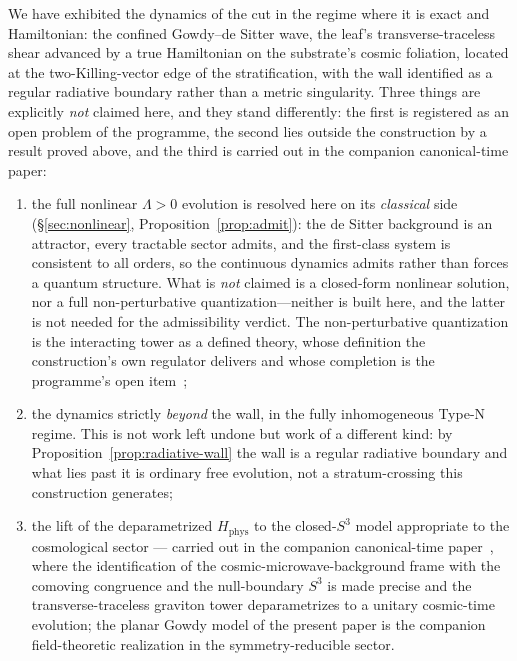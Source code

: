 \documentclass[11pt,a4paper]{article}
\theoremstyle{plain}
\theoremstyle{definition}
\theoremstyle{remark}
\newcommand{\Hphys}{H_{\mathrm{phys}}}
\begin{document}
We have exhibited the dynamics of the cut in the regime where it is exact and Hamiltonian: the confined Gowdy--de Sitter wave, the leaf's transverse-traceless shear advanced by a true Hamiltonian on the substrate's cosmic foliation, located at the two-Killing-vector edge of the stratification, with the wall identified as a regular radiative boundary rather than a metric singularity. Three things are explicitly \emph{not} claimed here, and they stand differently: the first is registered as an open problem of the programme, the second lies outside
the construction by a result proved above, and the third is carried out in the companion canonical-time paper:
\begin{enumerate}
\item the full nonlinear $\Lambda>0$ evolution is resolved here on its \emph{classical} side (\S\ref{sec:nonlinear}, Proposition~\ref{prop:admit}): the de Sitter background is an attractor, every tractable sector admits, and the first-class system is consistent to all orders, so the continuous dynamics admits rather than forces a quantum structure. What is \emph{not} claimed is a closed-form nonlinear solution, nor a full non-perturbative quantization---neither is built here, and the latter is not needed for the admissibility verdict. The non-perturbative quantization is the interacting tower as a defined theory, whose definition the construction's own regulator delivers and whose completion is the programme's open item~\cite{JanzenCanonicalTime};
\item the dynamics strictly \emph{beyond} the wall, in the fully inhomogeneous Type-N regime. This is not work left undone but work of a different kind: by Proposition~\ref{prop:radiative-wall} the wall is a regular radiative boundary and what lies past it is ordinary free evolution, not a stratum-crossing this construction generates;
\item the lift of the deparametrized $\Hphys$ to the closed-$S^3$ model appropriate to the cosmological sector --- carried out in the companion canonical-time paper~\cite{JanzenCanonicalTime}, where the identification of the cosmic-microwave-background frame with the comoving congruence and the null-boundary $S^3$ is made precise and the transverse-traceless graviton tower deparametrizes to a unitary cosmic-time evolution; the planar Gowdy model of the present paper is the companion field-theoretic realization in the symmetry-reducible sector.
\end{enumerate}
\end{document}
